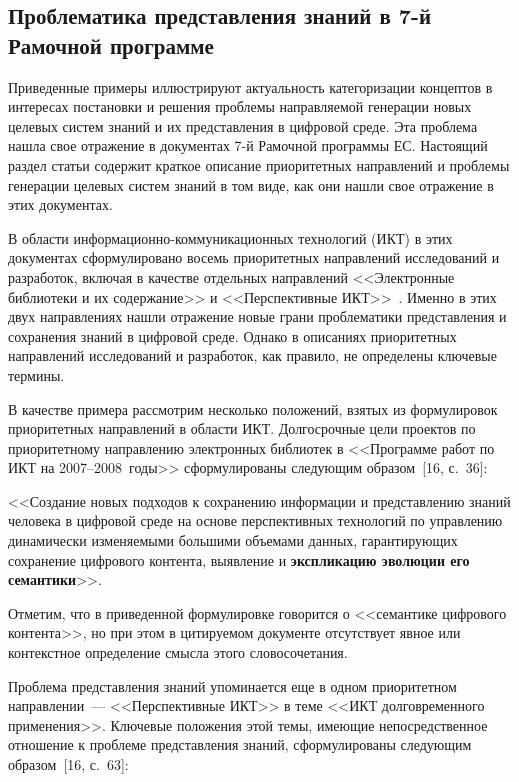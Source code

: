 \begin{multicols}{2}
\section{Проблематика представления знаний в 7-й Рамочной программе}

   Приведенные примеры иллюстрируют ак\-ту\-альность категоризации концептов в
интересах поста\-нов\-ки и решения проблемы направляемой %
генерации новых целевых систем
знаний и их пред\-став\-ле\-ния в цифровой среде. Эта проблема нашла свое отражение в
документах 7-й Рамочной программы ЕС. Настоящий раздел статьи содержит краткое
описание приоритетных направлений и проблемы генерации целевых систем знаний в том
виде, как они нашли свое отражение в этих документах.

   В области ин\-фор\-ма\-ци\-он\-но-ком\-му\-ни\-ка\-ци\-он\-ных технологий (ИКТ) в этих документах
сформулировано восемь приоритетных направлений исследований и разработок, включая в
качестве %
отдель\-ных направлений <<Электронные библиотеки и их содержание>> и
<<Перспективные ИКТ>>~\cite{14za, 15za}. Именно в этих двух направлениях нашли
отражение новые грани проблематики представления и сохранения знаний в цифровой среде.
Однако в описаниях приоритетных направлений исследований и разработок, как правило, не
определены ключевые термины.

   В качестве примера рассмотрим несколько положений, взятых из формулировок
приоритетных направлений в области ИКТ. Долгосрочные цели проектов по приоритетному
направлению электронных библиотек в <<Программе работ по ИКТ на 2007--2008~годы>>
сформулированы следующим образом~[16, с.~36]:

   <<Создание новых подходов к сохранению информации и представлению знаний
человека в циф\-ро\-вой среде на основе перспективных технологий по управлению
динамически изменяемыми большими объемами данных, гарантирующих сохранение
цифрового контента, выявление и \textbf{экспликацию эволюции его семантики}>>.

   Отметим, что в приведенной формулировке говорится о <<семантике цифрового
контента>>, но при этом в цитируемом документе отсутствует явное или контекстное
определение смысла этого словосочетания.

   Проблема представления знаний упоминается еще в одном приоритетном
   направлении~--- <<Перспективные ИКТ>> в теме <<ИКТ долговременного
применения>>. Ключевые положения этой темы, имеющие непосредственное отношение к
проблеме представления знаний, сформулированы следующим образом~[16, с.~63]:


\end{multicols}

